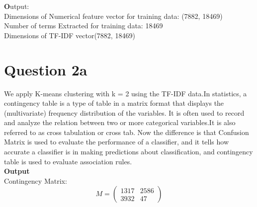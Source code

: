 \documentclass{article}
\begin{document}
\textbf Output: \\
Dimensions of Numerical feature vector for training data: (7882, 18469)\\
Number of terms Extracted for training data: 18469\\
Dimensions of TF-IDF vector(7882, 18469) \\
\section{Question 2a}
We apply K-means clustering with k = 2 using the TF-IDF data.In statistics, a contingency table is a type of table in a matrix format that displays the (multivariate) frequency distribution of the variables. It is often used to record and analyze the relation between two or more categorical variables.It is also referred to as cross tabulation or cross tab. Now the difference is that Confusion Matrix is used to evaluate the performance of a classifier, and it tells how accurate a classifier is in making predictions about classification, and contingency table is used to evaluate association rules.\\

\textbf{Output}\\
Contingency Matrix: \\
$$ M = \left( \begin{smallmatrix} 1317&2586\\ 3932&47 \end{smallmatrix} \right) $$
\end{document}
